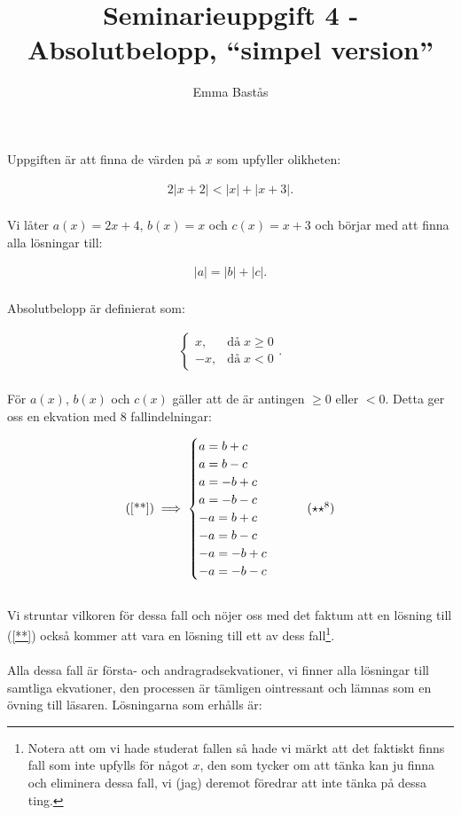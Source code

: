 \documentclass{article}
\title{Seminarieuppgift 4 - Absolutbelopp, ``simpel version''}
\author{Emma Bastås}
\begin{document}
\maketitle

\noindent Uppgiften är att finna de värden på $x$ som upfyller olikheten:

\begin{gather*}
  2|x+2| < |x| + |x+3|\text{.} \label{*}\tag{$\star$}
\end{gather*}
\\
Vi låter $a(x) = 2x+4$, $b(x)=x$ och $c(x) = x + 3$ och börjar med att finna alla lösningar till:

\begin{gather*}
  |a| = |b| + |c|\text{.} \label{**}\tag{$\star\star$}
\end{gather*}
\\
Absolutbelopp är definierat som:

\begin{gather*}
\begin{cases}
  x, & \text{då}\; x \geq 0\\
  -x, & \text{då}\; x < 0
\end{cases}\text{.}
\end{gather*}
\\
För $a(x)$, $b(x)$ och $c(x)$ gäller att de är antingen $\geq 0$ eller $< 0$. Detta ger oss en ekvation med 8 fallindelningar:

\begin{gather*}
  \text{(\ref{**})} \implies
  \begin{cases}
    a = b + c \\
    a = b - c \\
    a = - b + c \\
    a = - b - c \\
    -a = b + c \\
    -a = b - c \\
    -a = - b + c \\
    -a = - b - c \\
  \end{cases} \label{**8}\tag{$\star\star^{8}$}
\end{gather*}
\\
Vi struntar vilkoren för dessa fall och nöjer oss med det faktum att en lösning till (\ref{**}) också kommer att vara en lösning till ett av dess fall\footnote{Notera att om vi hade studerat fallen så hade vi märkt att det faktiskt finns fall som inte upfylls för något $x$, den som tycker om att tänka kan ju finna och eliminera dessa fall, vi (jag) deremot föredrar att inte tänka på dessa ting.}.
\\
\\
Alla dessa fall är första- och andragradsekvationer, vi finner alla lösningar till samtliga ekvationer, den processen är tämligen ointressant och lämnas som en övning till läsaren. Lösningarna som erhålls är:
\end{document}
